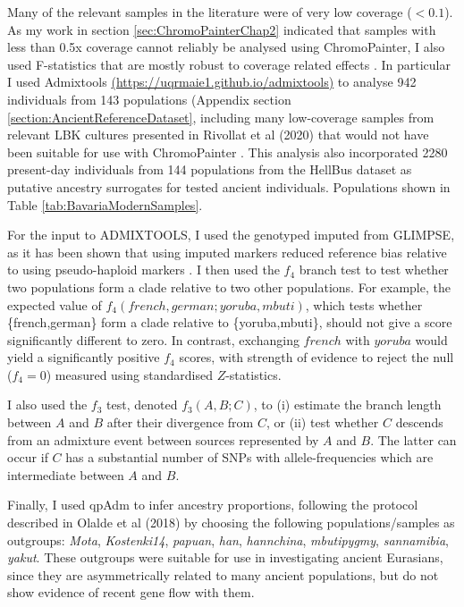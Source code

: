 Many of the relevant samples in the literature were of very low coverage ($<0.1$). As my work in section \ref{sec:ChromoPainterChap2} indicated that samples with less than 0.5x coverage cannot reliably be analysed using ChromoPainter, I also used F-statistics \cite{Patterson2012} that are mostly robust to coverage related effects \cite{AssessingqpAdm}. In particular I used Admixtools \url{(https://uqrmaie1.github.io/admixtools)} to analyse 942 individuals from 143 populations (Appendix section \ref{section:AncientReferenceDataset}, including many low-coverage samples from relevant LBK cultures presented in Rivollat et al (2020) that would not have been suitable for use with ChromoPainter \cite{rivollat2020france}. This analysis also incorporated 2280 present-day individuals from 144 populations from the HellBus dataset as putative ancestry surrogates for tested ancient individuals. Populations shown in Table \ref{tab:BavariaModernSamples}. 

For the input to ADMIXTOOLS, I used the genotyped imputed from GLIMPSE, as it has been shown that using imputed markers reduced reference bias relative to using pseudo-haploid markers \cite{Martiniano2017}. I then used the $f_{4}$ branch test to test whether two populations form a clade relative to two other populations. For example, the expected value of $f_{4}(french,german;yoruba,mbuti)$, which tests whether \{french,german\} form a clade relative to \{yoruba,mbuti\}, should not give a score significantly different to zero. In contrast, exchanging $french$ with $yoruba$ would yield a significantly positive $f_4$ scores, with strength of evidence to reject the null ($f_4 = 0$) measured using standardised $Z$-statistics.

I also used the $f_3$ test, denoted $f_{3}(A,B;C)$, to (i) estimate the branch length between $A$ and $B$ after their divergence from $C$, or (ii) test whether $C$ descends from an admixture event between sources represented by $A$ and $B$. The latter can occur if $C$ has a substantial number of SNPs with allele-frequencies which are intermediate between $A$ and $B$.

Finally, I used qpAdm to infer ancestry proportions, following the protocol described in Olalde et al (2018) by choosing the following populations/samples as outgroups: \textit{Mota}, \textit{Kostenki14}, \textit{papuan}, \textit{han}, \textit{hannchina}, \textit{mbutipygmy}, \textit{sannamibia}, \textit{yakut}. These outgroups were suitable for use in investigating ancient Eurasians, since they are asymmetrically related to many ancient populations, but do not show evidence of recent gene flow with them. 

